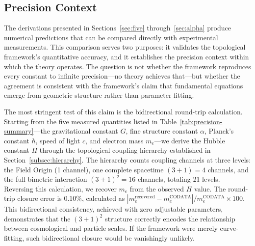 
\subsection{Precision Context}
\label{subsec:precision-context}

The derivations presented in Sections~\ref{sec:five} through~\ref{sec:alpha} produce numerical predictions that can be compared directly with experimental measurements. This comparison serves two purposes: it validates the topological framework's quantitative accuracy, and it establishes the precision context within which the theory operates. The question is not whether the framework reproduces every constant to infinite precision---no theory achieves that---but whether the agreement is consistent with the framework's claim that fundamental equations emerge from geometric structure rather than parameter fitting.

The most stringent test of this claim is the bidirectional round-trip calculation. Starting from the five measured quantities listed in Table~\ref{tab:precision-summary}---the gravitational constant $G$, fine structure constant $\alpha$, Planck's constant $\hbar$, speed of light $c$, and electron mass $m_e$---we derive the Hubble constant $H$ through the topological coupling hierarchy established in Section~\ref{subsec:hierarchy}. The hierarchy counts coupling channels at three levels: the Field Origin (1 channel), one complete spacetime $(3+1) = 4$ channels, and the full bimetric interaction $(3+1)^2 = 16$ channels, totaling 21 levels. Reversing this calculation, we recover $m_e$ from the observed $H$ value. The round-trip closure error is 0.10\%, calculated as $|m_e^{\text{recovered}} - m_e^{\text{CODATA}}| / m_e^{\text{CODATA}} \times 100$. This bidirectional consistency, achieved with zero adjustable parameters, demonstrates that the $(3+1)^2$ structure correctly encodes the relationship between cosmological and particle scales. If the framework were merely curve-fitting, such bidirectional closure would be vanishingly unlikely.

